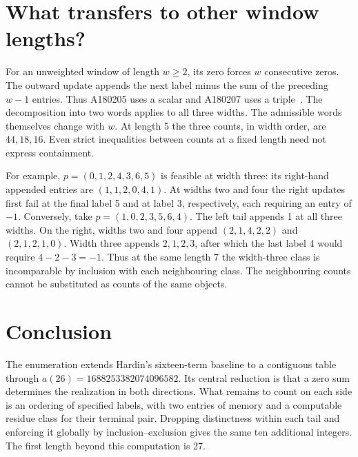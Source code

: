 \documentclass[11pt]{article}
\begin{document}
\section{What transfers to other window lengths?}\label{sec:widths}

For an unweighted window of length \(w\ge2\), its zero forces \(w\)
consecutive zeros. The outward update appends the next label minus the
sum of the preceding \(w-1\) entries. Thus A180205 uses a scalar and
A180207 uses a triple~\cite{hardintwo,hardinfour,two,four}. The decomposition into
two words applies to all three widths. The admissible words themselves
change with \(w\). At length 5 the three counts, in width order, are
\(44,18,16\). Even strict inequalities between counts at a fixed length
need not express containment.

For example, \(p=(0,1,2,4,3,6,5)\) is feasible at width three:
its right-hand appended entries are \((1,1,2,0,4,1)\). At widths two
and four the right updates first fail at the final label 5 and at label 3,
respectively, each requiring an entry of \(-1\).
Conversely, take \(p=(1,0,2,3,5,6,4)\). The left tail appends 1 at all
three widths. On the right, widths two and four append \((2,1,4,2,2)\)
and \((2,1,2,1,0)\). Width three appends \(2,1,2,3\), after which the
last label 4 would require \(4-2-3=-1\). Thus at the same length 7 the
width-three class is incomparable by inclusion with each neighbouring
class. The neighbouring counts cannot be substituted as counts of the
same objects.

\section{Conclusion}

The enumeration extends Hardin's sixteen-term baseline to a contiguous
table through \(a(26)=1688253382074096582\). Its central reduction is
that a zero sum determines the realization in both directions. What
remains to count on each side is an ordering of specified labels, with
two entries of memory and a computable residue class for their terminal
pair. Dropping distinctness within each tail and enforcing it globally by
inclusion--exclusion gives the same ten additional integers. The first
length beyond this computation is 27.
\end{document}
